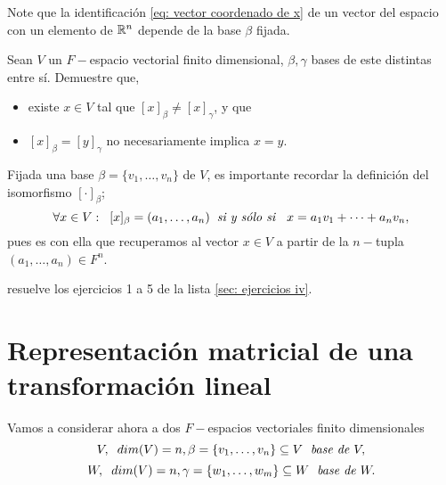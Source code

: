 Note que la identificación \eqref{eq: vector coordenado de x}
de un vector del espacio con un elemento de $\mathbb{R}^{n}$ depende de 
la base $\beta$ fijada. 

Sean $V$ un $F-$espacio vectorial finito dimensional, 
$\beta, \gamma$ bases de este distintas entre sí.
Demuestre que, 
\begin{itemize}
	\item existe $x \in V$ tal que 
	$[x]_{\beta} \neq [x]_{\gamma}$, y que 
	\item $[x]_{\beta} = [y]_{\gamma}$ no necesariamente implica 
	$x = y$.
\end{itemize}


\begin{nota}
	Fijada una base $\beta = \{ v_{1}, \ldots , v_{n} \}$ de $V$, 
	es importante recordar la definición del isomorfismo $[\cdot]_{\beta}$;
	\begin{equation}
			\label{eq: def del iso asociado a beta}
			\forall x \in V: 
			\hspace{0.2cm}
			[x]_{\beta} = (a_{1}, \ldots , a_{n}) \hspace{0.2cm}
			\textit{si y sólo si } \hspace{0.2cm}
			x = a_{1} v_{1} + \cdots + a_{n} v_{n},
	\end{equation}
	pues es con ella que recuperamos al vector $x \in V$
	a partir de la $n-$tupla $(a_{1}, \ldots , a_{n}) \in F^{n}$.
\end{nota}

 resuelve los ejercicios 1 a 5
de la lista \ref{sec: ejercicios iv}.



\section{Representación matricial de una transformación lineal}

Vamos a considerar ahora a dos $F-$espacios vectoriales finito 
dimensionales
\[
V, \hspace{0.2cm} dim(V) = n,\beta = \{ v_{1}, \ldots, v_{n} \}
\subseteq V \hspace{0.1cm} \textit{ base de }V,
\]
\[
W, \hspace{0.2cm} dim(V) = n,\gamma = \{ w_{1}, \ldots, w_{m} \}
\subseteq W \hspace{0.1cm} \textit{ base de }W.
\]

